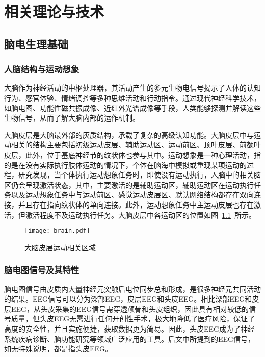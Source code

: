 
\chapter{相关理论与技术}

\section{脑电生理基础}

\subsection{人脑结构与运动想象}

大脑作为神经活动的中枢处理器，其活动产生的多元生物电信号揭示了人体的认知行为、感官体验、情绪调控等多种思维活动和行动指令。通过现代神经科学技术，如脑电图、功能性磁共振成像、近红外光谱成像等手段，人类能够探测并解读这些生物信号，从而了解大脑内部的运作机制。

大脑皮层是大脑最外部的灰质结构，承载了复杂的高级认知功能。大脑皮层中与运动相关的结构主要包括初级运动皮层、辅助运动区、运动前区、顶叶皮层、前额叶皮层\cite{ZDYS201809014}，此外，位于基底神经节的纹状体也参与其中。运动想象是一种心理活动，指的是在没有实际执行肢体运动的情况下，个体在脑海中模拟或重现某项运动的过程，研究发现，当个体执行运动想象任务时，即使没有运动执行，人脑中的相关脑区仍会呈现激活状态，其中，主要激活的是辅助运动区，辅助运动区在运动执行任务以及运动想象任务中与运动前区、感觉运动皮层区、默认网络结构都存在双向连接\cite{solodkin2004fine}，并且存在指向纹状体的单向连接\cite{watanabe2015effects}。此外，运动想象任务中主运动皮层也存在激活，但激活程度不及运动执行任务\cite{solodkin2004fine,kasess2008suppressive}。大脑皮层中各运动区的位置如图~\ref{fig:brain}~所示。
\begin{figure}[ht]
    \centering
    \texttt{[image: brain.pdf]}
    \caption{大脑皮层运动相关区域\cite{penfield1950cerebral}}
    \label{fig:brain}
\end{figure}

\subsection{脑电图信号及其特性}

脑电图信号由皮质内大量神经元突触后电位同步总和形成，是很多神经元共同活动的结果\cite{ZWQX201803022}。EEG信号可以分为深部EEG，皮层EEG和头皮EEG\cite{1022779250.nh}。相比深部EEG和皮层EEG，从头皮采集的EEG信号需穿透颅骨和头皮组织，因此具有相对较低的信号质量，但头皮EEG无需进行任何开创性手术，极大地降低了医疗风险，保证了高度的安全性，并且实施便捷，获取数据更为简易。因此，头皮EEG成为了神经系统疾病诊断、脑功能研究等领域广泛应用的工具。后文中所提到的EEG信号，如无特殊说明，都是指头皮EEG。

